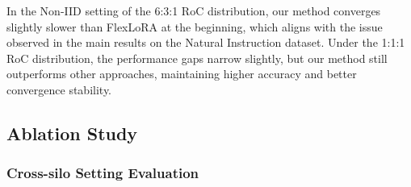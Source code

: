 \documentclass[lettersize,journal]{IEEEtran}
\begin{document}
{%
In the Non-IID setting of the 6:3:1 RoC distribution, our method converges slightly slower than FlexLoRA at the beginning, which aligns with the issue observed in the main results on the Natural Instruction dataset. Under the 1:1:1 RoC distribution, the performance gaps narrow slightly, but our method still outperforms other approaches, maintaining higher accuracy and better convergence stability.
} 

\subsection{Ablation Study}\label{exp:ablation-results}
\subsubsection{Cross-silo Setting Evaluation}
\end{document}
